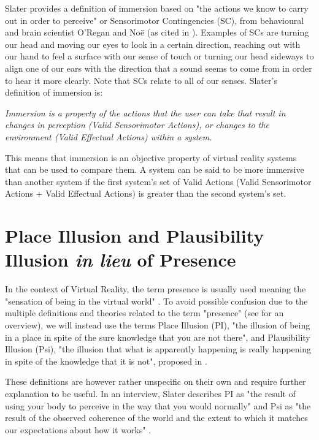 Slater provides a definition of immersion based on "the actions we know to carry out in order to perceive" or Sensorimotor Contingencies (SC), from behavioural and brain scientist O'Regan and Noë (as cited in \parencite{Slater2009}). Examples of SCs are turning our head and moving our eyes to look in a certain direction, reaching out with our hand to feel a surface with our sense of touch or turning our head sideways to align one of our ears with the direction that a sound seems to come from in order to hear it more clearly. Note that SCs relate to all of our senses. Slater's definition of immersion is:

\begin{displayquote}
\textit{Immersion is a property of the actions that the user can take that result in changes in perception (Valid Sensorimotor Actions), or changes to the environment (Valid Effectual Actions) within a system.} \parencite{Slater2009}
\end{displayquote}

This means that immersion is an objective property of virtual reality systems that can be used to compare them. A system can be said to be more immersive than another system if the first system's set of Valid Actions (Valid Sensorimotor Actions + Valid Effectual Actions) is greater than the second system's set.

\section{Place Illusion and Plausibility Illusion \textit{in lieu} of Presence}
\label{sec:PIandPsi}

In the context of Virtual Reality, the term presence is usually used meaning the "sensation of being in the virtual world" \parencite{Schuemie2001}. To avoid possible confusion due to the multiple definitions and theories related to the term "presence" (see \parencite{Schuemie2001} for an overview), we will instead use the terms Place Illusion (PI), "the illusion of being in a place in spite of the sure knowledge that you are not there", and Plausibility Illusion (Psi), "the illusion that what is apparently happening is really happening in spite of the knowledge that it is not", proposed in \parencite{Slater2009}.

These definitions are however rather unspecific on their own and require further explanation to be useful. In an interview, Slater describes PI as "the result of using your body to perceive in the way that you would normally" and Psi as "the result of the observed coherence of the world and the extent to which it matches our expectations about how it works" \parencite{Slater2015}.

